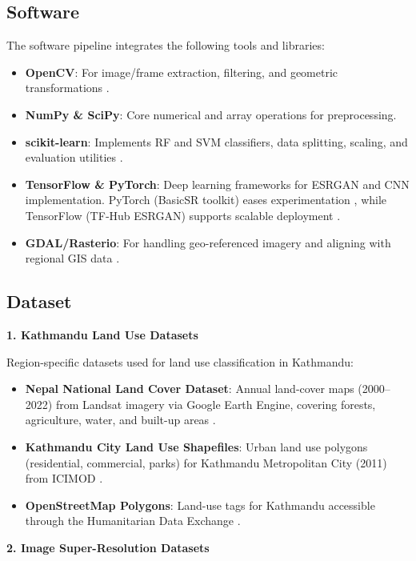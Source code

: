 \subsection{Software}
The software pipeline integrates the following tools and libraries:
\begin{itemize}
  \item \textbf{OpenCV}: For image/frame extraction, filtering, and geometric transformations \cite{opencv2023}.
  \item \textbf{NumPy \& SciPy}: Core numerical and array operations for preprocessing.
  \item \textbf{scikit-learn}: Implements RF and SVM classifiers, data splitting, scaling, and evaluation utilities \cite{scikit2023}.
  \item \textbf{TensorFlow \& PyTorch}: Deep learning frameworks for ESRGAN and CNN implementation. PyTorch (BasicSR toolkit) eases experimentation \cite{pytorch2023}, while TensorFlow (TF‑Hub ESRGAN) supports scalable deployment \cite{tensorflow2023}.
  \item \textbf{GDAL/Rasterio}: For handling geo-referenced imagery and aligning with regional GIS data \cite{gdal2023}.
\end{itemize} 


\subsection{Dataset}

\textbf{1. Kathmandu Land Use Datasets}

Region-specific datasets used for land use classification in Kathmandu:

\begin{itemize}
  \item \textbf{Nepal National Land Cover Dataset}: Annual land-cover maps (2000–2022) from Landsat imagery via Google Earth Engine, covering forests, agriculture, water, and built-up areas \cite{frtc2023nlcms}.
  \item \textbf{Kathmandu City Land Use Shapefiles}: Urban land use polygons (residential, commercial, parks) for Kathmandu Metropolitan City (2011) from ICIMOD \cite{icimod2011landuse}.
  \item \textbf{OpenStreetMap Polygons}: Land-use tags for Kathmandu accessible through the Humanitarian Data Exchange \cite{osm2023kathmandu}.
\end{itemize}

\textbf{2. Image Super-Resolution Datasets}

